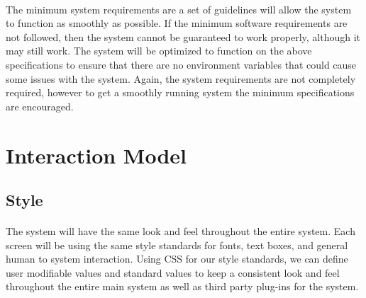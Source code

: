 \documentclass[letterpaper,12pt]{report}
\begin{document}
\paragraph*{}\hspace{0.6cm}The minimum system requirements are a set of guidelines will allow the system to function as smoothly as possible. If the minimum software requirements are not followed, then the system cannot be guaranteed to work properly, although it may still work. The system will be optimized to function on the above specifications to ensure that there are no environment variables that could cause some issues with the system. Again, the system requirements are not completely required, however to get a smoothly running system the minimum specifications are encouraged. 



\pagebreak
\section{Interaction Model}
\subsection{Style}
\paragraph*{}\hspace{0.6cm}The system will have the same look and feel throughout the entire system. Each screen will be using the same style standards for fonts, text boxes, and general human to system interaction. Using CSS for our style standards, we can define user modifiable values and standard values to keep a consistent look and feel throughout the entire main system as well as third party plug-ins for the system.
\end{document}
